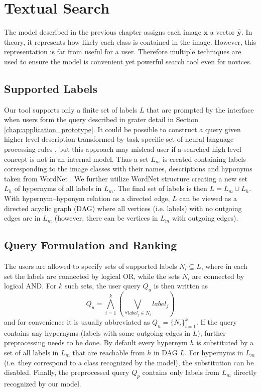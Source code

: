 \chapter{Textual Search}\label{chap:text_search}

The model described in the previous chapter assigns each image $\bm{x}$ a vector $\bm{\hat{y}}$. In theory, it represents how likely each class is contained in the image. However, this representation is far from useful for a user. Therefore multiple techniques are used to ensure the model is convenient yet powerful search tool even for novices.

\section{Supported Labels}
Our tool supports only a finite set of labels $L$ that are prompted by the interface when users form the query described in grater detail in Section \ref{chap:application_prototype}. It could be possible to construct a query given higher level description transformed by task-specific set of neural language processing rules \cite{moumtzidou2017verge}, but this approach may mislead user if a searched high level concept is not in an internal model. Thus a set $L_m$ is created containing labels corresponding to the image classes with their \textsf{names}, \textsf{descriptions} and \textsf{hyponyms} taken from WordNet \cite{WordNet}. We further utilize WordNet structure creating a new set $L_h$ of hypernyms of all labels in $L_m$. The final set of labels is then $L=L_m\cup L_h$. With hypernym--hyponym relation as a directed edge, $L$ can be viewed as a directed acyclic graph (DAG) where all vertices (i.e. labels) with no outgoing edges are in $L_m$ (however, there can be vertices in $L_m$ with outgoing edges).

\section{Query Formulation and Ranking}\label{sec:query_formulation_and_ranking}
The users are allowed to specify sets of supported labels $N_i \subseteq L$, where in each set the labels are connected by logical \textsf{OR}, while the sets $N_i$ are connected by logical \textsf{AND}. For $k$ such sets, the user query $Q_u$ is then written as
\begin{equation}
	Q_u=\bigwedge\limits_{i=1}^k\left(\bigvee\limits_{\forall label_j\in N_i} label_j \right)
\end{equation}
and for convenience it is usually abbreviated as $Q_u=\{N_i\}_{i=1}^k$. If the query contains any hypernyms (labels with some outgoing edges in $L$), further preprocessing needs to be done. By default every hypernym $h$ is substituted by a set of all labels in $L_m$ that are reachable from $h$ in DAG $L$. For hypernyms in $L_m$ (i.e. they correspond to a class recognized by the model), the substitution can be disabled. Finally, the preprocessed query $Q_p$ contains only labels from $L_m$ directly recognized by our model.

